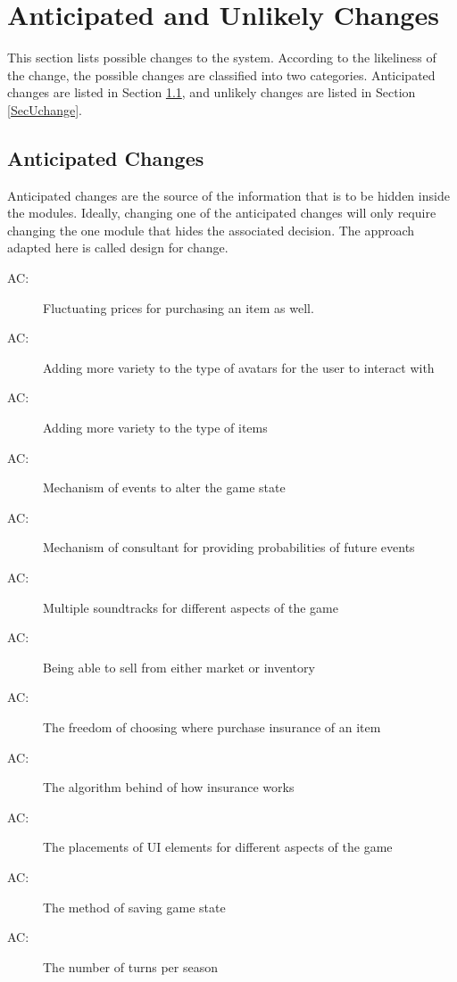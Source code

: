 \documentclass[12pt, titlepage]{article}
\newcounter{acnum}
\newcommand{\actheacnum}{AC\theacnum}
\begin{document}
\section{Anticipated and Unlikely Changes} \label{SecChange}

This section lists possible changes to the system. According to the likeliness
of the change, the possible changes are classified into two
categories. Anticipated changes are listed in Section \ref{SecAchange}, and
unlikely changes are listed in Section \ref{SecUchange}.

\subsection{Anticipated Changes} \label{SecAchange}

Anticipated changes are the source of the information that is to be hidden
inside the modules. Ideally, changing one of the anticipated changes will only
require changing the one module that hides the associated decision. The approach
adapted here is called design for
change.

\begin{description}
\item[ \actheacnum \label{PriceFluctuate}:] Fluctuating prices for purchasing an item as well.
\item[ \actheacnum \label{AvatarVariety}:] Adding more variety to the type of avatars for the user to interact with
\item[ \actheacnum \label{ItemVariety}:] Adding more variety to the type of items
\item[ \actheacnum \label{EventMechanism}:] Mechanism of events to alter the game state
\item[ \actheacnum \label{ConsultantMechanism}:] Mechanism of consultant for providing probabilities of future events
\item[ \actheacnum \label{SoundtrackVariety}:] Multiple soundtracks for different aspects of the game
\item[ \actheacnum \label{SellOptions}:] Being able to sell from either market or inventory 
\item[ \actheacnum \label{PurchaseInsurance}:] The freedom of choosing where purchase insurance of an item
\item[ \actheacnum \label{InsuranceAlgorithm}:] The algorithm behind of how insurance works
\item[ \actheacnum \label{UIComponents}:] The placements of UI elements for different aspects of the game
\item[ \actheacnum \label{SaveGame}:] The method of saving game state
\item[ \actheacnum \label{TurnNumber}:] The number of turns per season


\end{description}
\end{document}
